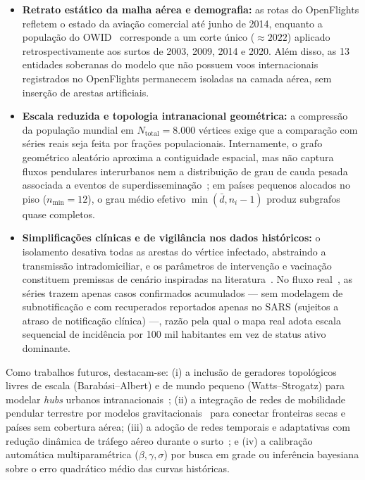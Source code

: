 \documentclass[11pt]{article}
\begin{document}
\begin{itemize}
  \item \textbf{Retrato estático da malha aérea e demografia:} as rotas do OpenFlights refletem o estado da aviação comercial até junho de 2014, enquanto a população do OWID~\cite{owid_covid_2023} corresponde a um corte único ($\approx 2022$) aplicado retrospectivamente aos surtos de 2003, 2009, 2014 e 2020. Além disso, as 13 entidades soberanas do modelo que não possuem voos internacionais registrados no OpenFlights permanecem isoladas na camada aérea, sem inserção de arestas artificiais.
  \item \textbf{Escala reduzida e topologia intranacional geométrica:} a compressão da população mundial em $N_{\mathrm{total}} = 8.000$ vértices exige que a comparação com séries reais seja feita por frações populacionais. Internamente, o grafo geométrico aleatório aproxima a contiguidade espacial, mas não captura fluxos pendulares interurbanos nem a distribuição de grau de cauda pesada associada a eventos de superdisseminação~\cite{lipsitch2003,pastor2015}; em países pequenos alocados no piso ($n_{\min} = 12$), o grau médio efetivo $\min(\bar{d}, n_i - 1)$ produz subgrafos quase completos.
  \item \textbf{Simplificações clínicas e de vigilância nos dados históricos:} o isolamento desativa todas as arestas do vértice infectado, abstraindo a transmissão intradomiciliar, e os parâmetros de intervenção e vacinação constituem premissas de cenário inspiradas na literatura~\cite{donnelly2003,ferguson2005}. No fluxo real~\cite{jhu_kaggle_covid,kaggle_ebola,kaggle_h1n1,kaggle_sars}, as séries trazem apenas casos confirmados acumulados --- sem modelagem de subnotificação e com recuperados reportados apenas no SARS (sujeitos a atraso de notificação clínica) ---, razão pela qual o mapa real adota escala sequencial de incidência por 100 mil habitantes em vez de status ativo dominante.
\end{itemize}

Como trabalhos futuros, destacam-se: (i) a inclusão de geradores topológicos livres de escala (Barabási--Albert) e de mundo pequeno (Watts--Strogatz) para modelar \emph{hubs} urbanos intranacionais~\cite{pastor2015}; (ii) a integração de redes de mobilidade pendular terrestre por modelos gravitacionais~\cite{balcan2009} para conectar fronteiras secas e países sem cobertura aérea; (iii) a adoção de redes temporais e adaptativas com redução dinâmica de tráfego aéreo durante o surto~\cite{colizza2006}; e (iv) a calibração automática multiparamétrica ($\beta, \gamma, \sigma$) por busca em grade ou inferência bayesiana sobre o erro quadrático médio das curvas históricas. 
\end{document}
